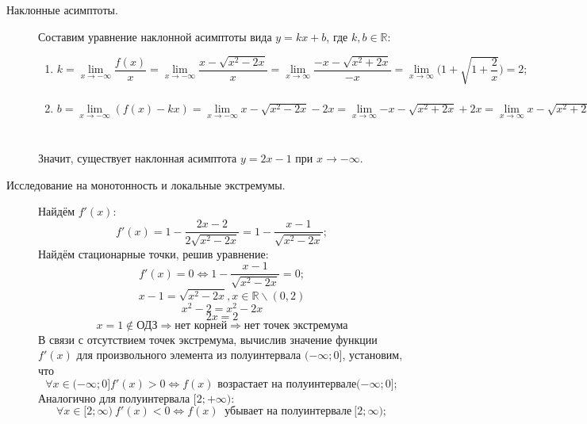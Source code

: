 \documentclass{article}
\begin{document}
\begin{description}
\item[Наклонные асимптоты.] Составим уравнение наклонной асимптоты вида $y = kx + b$, где $k, b \in \mathbb{R}:$
    \begin{enumerate}[start=3]
        \item $k = \lim\limits_{x \to -\infty}{\dfrac {f(x)} {x}} = \lim\limits_{x \to -\infty}{\dfrac{x-\sqrt{x^2-2x}}{x}} = \lim\limits_{x \to \infty}{\dfrac{-x-\sqrt{x^2+2x}} {-x}} = \lim\limits_{x \to \infty}\Bigg(1 + \sqrt{1 + \dfrac 2 x}\Bigg) = 2;$
        \item $b = \lim\limits_{x \to -\infty}{(f(x) - kx)} = \lim\limits_{x \to -\infty}{x - \sqrt{x^2-2x} - 2x} = \lim\limits_{x \to \infty}{-x - \sqrt{x^2+2x} + 2x} = \lim\limits_{x \to \infty}{x - \sqrt{x^2+2x}} = \lim\limits_{x \to \infty}\dfrac{x^2 - x^2 - 2x}{x + \sqrt{x^2+2x}} = \lim\limits_{x \to \infty}\dfrac{-2}{1 + \sqrt{1+\dfrac 2 x}} = \dfrac{-2}{2} = -1;$
    \end{enumerate}
    Значит, существует наклонная асимптота  $y = 2x - 1$ при $x \to -\infty.$

\item[Исследование на монотонность и локальные экстремумы.] Найдём $f'(x)$:
    \begin{equation*}
        f'(x) = 1 - \dfrac{2x - 2}{2\sqrt{x^2 - 2x}} = 1 - \dfrac{x - 1}{\sqrt{x^2 - 2x}};
    \end{equation*}
    Найдём стационарные точки, решив уравнение:
    \begin{equation*}
        f'(x) = 0 \Leftrightarrow 1 - \dfrac{x - 1}{\sqrt{x^2 - 2x}} = 0;
    \end{equation*}
    \begin{equation*}
        x - 1 = \sqrt{x^2 - 2x}, x \in \mathbb{R} \backslash (0,2)
    \end{equation*}
    \begin{equation*}
        x^2 - 2 = x^2 - 2x
    \end{equation*}
    \begin{equation*}
        2x = 2
    \end{equation*}
    \begin{equation*}
        x = 1 \notin \textrm{ОДЗ} \Rightarrow \textrm{нет корней} \Rightarrow \textrm{нет точек экстремума}
    \end{equation*}
    В связи с отсутствием точек экстремума, вычислив значение функции $f'(x)$ для произвольного элемента из полуинтервала $(-\infty;0]$, установим, что
    \begin{equation}
        \forall x \in (-\infty;0] f'(x) > 0 \Leftrightarrow f(x) \textrm{ возрастает на полуинтервале} (-\infty;0];
    \end{equation}
    Аналогично для полуинтервала $[2;+\infty)$:
    \begin{equation}
        \forall x \in [2;\infty) ~ f'(x) < 0 \Leftrightarrow f(x) ~ \textrm{ убывает на полуинтервале} ~ [2;\infty);
    \end{equation}


\end{description}
\end{document}
